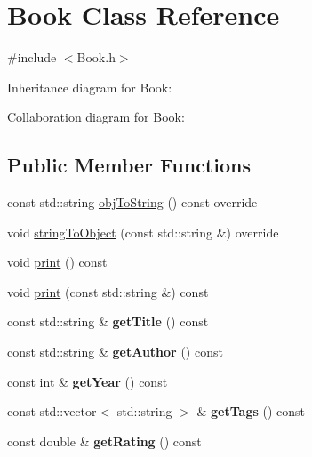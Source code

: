 \hypertarget{classBook}{}\section{Book Class Reference}
\label{classBook}


{\ttfamily \#include $<$Book.\+h$>$}



Inheritance diagram for Book\+:


Collaboration diagram for Book\+:
\subsection*{Public Member Functions}
\begin{DoxyCompactItemize}
\item 
const std\+::string \hyperlink{classBook_a693f08d322fa1395e5bc1f864c380b66}{obj\+To\+String} () const override
\item 
void \hyperlink{classBook_a260ec829661a21befcf11a34e6c2aeca}{string\+To\+Object} (const std\+::string \&) override
\item 
void \hyperlink{classBook_af46441a304bd9d514fc9fb0cae3536cc}{print} () const
\item 
void \hyperlink{classBook_adf345a9bf2403f9d1d56aa10b2c26d3e}{print} (const std\+::string \&) const
\item 
\mbox{\label{classBook_ad656beaa1c9ebb225792097ffbed6860}} 
const std\+::string \& {\bfseries get\+Title} () const
\item 
\mbox{\label{classBook_ad5dda425ee6e26e530f19caf97f880c2}} 
const std\+::string \& {\bfseries get\+Author} () const
\item 
\mbox{\label{classBook_a8a44e7a9195ed0fa58b8ba21474edbe3}} 
const int \& {\bfseries get\+Year} () const
\item 
\mbox{\label{classBook_a5758e7e16c6f1373d6518caa01a9dda4}} 
const std\+::vector$<$ std\+::string $>$ \& {\bfseries get\+Tags} () const
\item 
\mbox{\label{classBook_ad9e02792e52aa91a81b746ad87756576}} 
const double \& {\bfseries get\+Rating} () const
\item 
\mbox{\label{classBook_a2a249a303bbdcd732a4b635c86a1b43a}} 

\end{DoxyCompactItemize}
